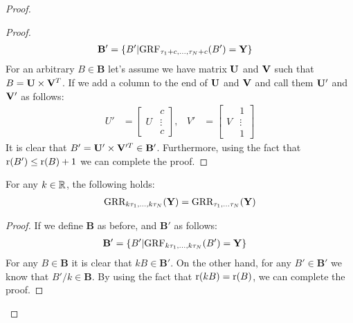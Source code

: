 \documentclass{article}
\newcommand{\R}{\ensuremath{\Real}}
\begin{document}
\begin{thm:thm}
\begin{proof}
{\begin{thm:lemma}
\begin{proof}
\begin{align}
\mathbf{B'} &=\{B'|\text{GRF}_{\tau_1+c,...,\tau_N+c}(B')=\mathbf{Y}\}
\end{align}
For an arbitrary $B\in \mathbf{B}$ let's assume we have matrix $\mathbf{U}$ and $\mathbf{V}$ such that $B=\mathbf{U} \times \mathbf{V}^T$. If we add a column to the end of $\mathbf{U}$ and $\mathbf{V}$ and call them $\mathbf{U}'$ and $\mathbf{V}'$ as follows:
\begin{align}
U'&=\begin{bmatrix}
 & c\\ 
U & \vdots \\ 
 & c
\end{bmatrix}
,& V'&=\begin{bmatrix}
 & 1\\ 
V & \vdots \\ 
 & 1 
\end{bmatrix}
\end{align}
It is clear that $B'=\mathbf{U}'\times \mathbf{V}'^T \in \mathbf{B'}$. Furthermore, using the fact that $\mathrm{r}(B')\leq \mathrm{r}(B)+1$ we can complete the proof.
\end{proof}
\end{thm:lemma}

\begin{thm:lemma}
For any $k \in \R$, the following holds: 
\begin{align}
\text{GRR}_{k\tau_{1},...,k\tau_{N}}(\mathbf{Y}) = \text{GRR}_{\tau_{1},...\tau_{N}}(\mathbf{Y})
\end{align}
\begin{proof}
If we define $\mathbf{B}$ as before, and $\mathbf{B'}$ as follows:
\begin{align}
\mathbf{B'} &=\{B'|\text{GRF}_{k\tau_1,...,k\tau_N}(B')=\mathbf{Y}\}
\end{align}
For any $B\in \mathbf{B}$  it is clear that  $kB\in \mathbf{B'}$. On the other hand, for any $B'\in \mathbf{B'}$  we know that  $ B'/k\in \mathbf{B}$. By using the fact that $\mathrm{r}(kB) = \mathrm{r}(B)$, we can complete the proof.
\end{proof}
\end{thm:lemma}

}
\end{proof}
\end{thm:thm}
\end{document}
